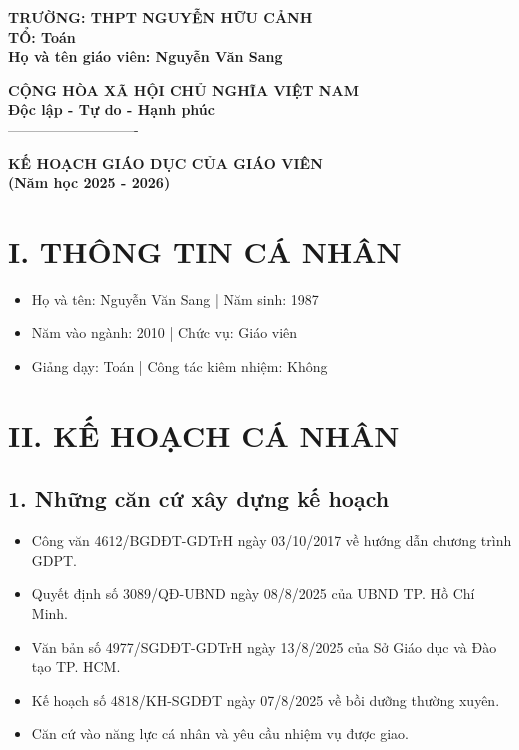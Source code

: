 \documentclass[12pt,a4paper]{article}
\begin{document}
\noindent
\begin{minipage}[t]{0.5\textwidth}
    \textbf{TRƯỜNG: THPT NGUYỄN HỮU CẢNH}\\
    \textbf{TỔ: Toán}\\
    \textbf{Họ và tên giáo viên: Nguyễn Văn Sang}
\end{minipage}
\begin{minipage}[t]{0.5\textwidth}
    \centering
    \textbf{CỘNG HÒA XÃ HỘI CHỦ NGHĨA VIỆT NAM}\\
    \textbf{Độc lập - Tự do - Hạnh phúc}\\
    ----------------------------
\end{minipage}

\vspace{0.8cm}
\begin{center}
    \Large \textbf{KẾ HOẠCH GIÁO DỤC CỦA GIÁO VIÊN} \\
    \large \textbf{(Năm học 2025 - 2026)}
\end{center}

\section*{I. THÔNG TIN CÁ NHÂN}
\begin{itemize}[noitemsep]
    \item Họ và tên: Nguyễn Văn Sang \quad | \quad Năm sinh: 1987
    \item Năm vào ngành: 2010 \quad | \quad Chức vụ: Giáo viên
    \item Giảng dạy: Toán \quad | \quad Công tác kiêm nhiệm: Không
\end{itemize}

\section*{II. KẾ HOẠCH CÁ NHÂN}
\subsection*{1. Những căn cứ xây dựng kế hoạch}
\begin{itemize}[label=-, noitemsep]
    \item Công văn 4612/BGDĐT-GDTrH ngày 03/10/2017 về hướng dẫn chương trình GDPT.
    \item Quyết định số 3089/QĐ-UBND ngày 08/8/2025 của UBND TP. Hồ Chí Minh.
    \item Văn bản số 4977/SGDĐT-GDTrH ngày 13/8/2025 của Sở Giáo dục và Đào tạo TP. HCM.
    \item Kế hoạch số 4818/KH-SGDĐT ngày 07/8/2025 về bồi dưỡng thường xuyên.
    \item Căn cứ vào năng lực cá nhân và yêu cầu nhiệm vụ được giao.
\end{itemize}
\end{document}
